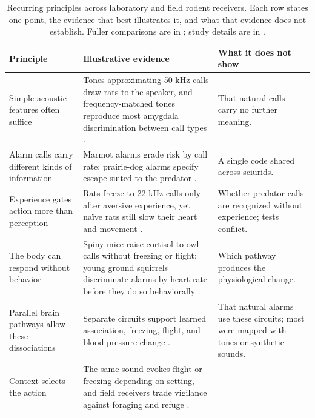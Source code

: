 \begin{table}[tbp]
\centering
\footnotesize
\singlespacing
\setlength{\tabcolsep}{5pt}
\renewcommand{\arraystretch}{1.3}
\setlength{\belowcaptionskip}{6pt}
\caption{Recurring principles across laboratory and field rodent receivers. Each row states one point, the evidence that best illustrates it, and what that evidence does not establish. Fuller comparisons are in ; study details are in .}
\label{tab:comparison}
\begin{tabular}{@{}>{\raggedright\arraybackslash}p{1.35in}>{\raggedright\arraybackslash}p{3.0in}>{\raggedright\arraybackslash}p{1.75in}@{}}
\toprule
\textbf{Principle} & \textbf{Illustrative evidence} & \textbf{What it does not show} \\
\midrule
Simple acoustic features often suffice
  & Tones approximating 50-kHz calls draw rats to the speaker, and frequency-matched tones reproduce most amygdala discrimination between call types \citep{WohrSchwarting2007,ParsanaEtAl2012a}.
  & That natural calls carry no further meaning. \\
Alarm calls carry different kinds of information
  & Marmot alarms grade risk by call rate; prairie-dog alarms specify escape suited to the predator \citep{BlumsteinArmitage1997,KiriazisSlobodchikoff2006}.
  & A single code shared across sciurids. \\
Experience gates action more than perception
  & Rats freeze to 22-kHz calls only after aversive experience, yet naïve rats still slow their heart and movement \citep{KimEtAl2010,OlszynskiEtAl2020}.
  & Whether predator calls are recognized without experience; tests conflict. \\
The body can respond without behavior
  & Spiny mice raise cortisol to owl calls without freezing or flight; young ground squirrels discriminate alarms by heart rate before they do so behaviorally \citep{EilamEtAl1999,Mateo1996}.
  & Which pathway produces the physiological change. \\
Parallel brain pathways allow these dissociations
  & Separate circuits support learned association, freezing, flight, and blood-pressure change \citep{LeDouxEtAl1988,FadokEtAl2017,TovoteEtAl2016,LiEtAl2021}.
  & That natural alarms use these circuits; most were mapped with tones or synthetic sounds. \\
Context selects the action
  & The same sound evokes flight or freezing depending on setting, and field receivers trade vigilance against foraging and refuge \citep{MongeauEtAl2003,BaackSwitzer2000}.

\end{tabular}
\end{table}
